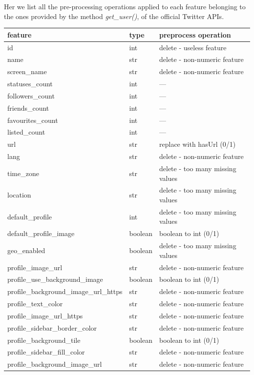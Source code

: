 Her we list all the pre-processing operations applied to each feature belonging to the ones provided by the method \textit{get\_user()}, of the official Twitter APIs.
\newpage
\small
\begin{center}
	\begin{tabular}{lll}
		\\feature&type&preprocess operation\\
		\hline\hline
		id&int&delete - useless feature\\
		name&str&delete - non-numeric feature\\
		screen\_name&str&delete - non-numeric feature\\
		statuses\_count&int&---\\
		followers\_count&int&---\\
		friends\_count&int&---\\
		favourites\_count&int&---\\
		listed\_count&int&---\\
		url&str&replace with hasUrl (0/1)\\
		lang&str&delete - non-numeric feature\\
		time\_zone&str&delete - too many missing values\\
		location&str&delete - too many missing values\\
		default\_profile&int&delete - too many missing values\\
		default\_profile\_image&boolean&boolean to int (0/1)\\
		geo\_enabled&boolean&delete - too many missing values\\
		profile\_image\_url&str&delete - non-numeric feature\\
		profile\_use\_background\_image&boolean&boolean to int (0/1)\\
		profile\_background\_image\_url\_https&str&delete - non-numeric feature\\
		profile\_text\_color&str&delete - non-numeric feature\\
		profile\_image\_url\_https&str&delete - non-numeric feature\\
		profile\_sidebar\_border\_color&str&delete - non-numeric feature\\
		profile\_background\_tile&boolean&boolean to int (0/1)\\
		profile\_sidebar\_fill\_color&str&delete - non-numeric feature\\
		profile\_background\_image\_url&str&delete - non-numeric feature\\

\end{tabular}
\end{center}
